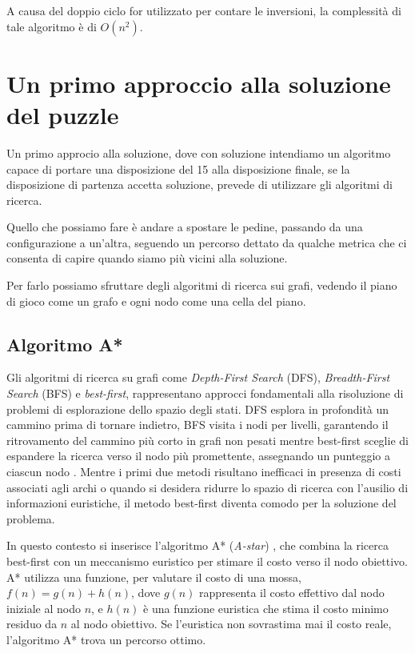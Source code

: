 A causa del doppio ciclo for utilizzato per contare le inversioni, la complessità di tale algoritmo è di $O(n^2)$.

\section{Un primo approccio alla soluzione del puzzle}
Un primo approcio alla soluzione, dove con soluzione intendiamo un algoritmo capace di portare una disposizione del 15 alla disposizione finale, se la disposizione di partenza accetta soluzione, prevede di utilizzare gli algoritmi di ricerca.

Quello che possiamo fare è andare a spostare le pedine, passando da una configurazione a un'altra, seguendo un percorso dettato da qualche metrica che ci consenta di capire quando siamo più vicini alla soluzione.

Per farlo possiamo sfruttare degli algoritmi di ricerca sui grafi, vedendo il piano di gioco come un grafo e ogni nodo come una cella del piano. 

\subsection{Algoritmo A*}
Gli algoritmi di ricerca su grafi come \textit{Depth-First Search} (DFS), \textit{Breadth-First Search} (BFS) e \textit{best-first}, rappresentano approcci fondamentali alla risoluzione di problemi di esplorazione dello spazio degli stati. DFS esplora in profondità un cammino prima di tornare indietro, BFS visita i nodi per livelli, garantendo il ritrovamento del cammino più corto in grafi non pesati mentre best-first sceglie di espandere la ricerca verso il nodo più promettente, assegnando un punteggio a ciascun nodo \cite{15}. Mentre i primi due metodi risultano inefficaci in presenza di costi associati agli archi o quando si desidera ridurre lo spazio di ricerca con l'ausilio di informazioni euristiche, il metodo best-first diventa comodo per la soluzione del problema. 

In questo contesto si inserisce l'algoritmo A* (\textit{A-star}) \cite{15}, che combina la ricerca best-first con un meccanismo euristico per stimare il costo verso il nodo obiettivo. A* utilizza una funzione, per valutare il costo di una mossa, \( f(n) = g(n) + h(n) \), dove \( g(n) \) rappresenta il costo effettivo dal nodo iniziale al nodo \( n \), e \( h(n) \) è una funzione euristica che stima il costo minimo residuo da \( n \) al nodo obiettivo. Se l’euristica non sovrastima mai il costo reale, l’algoritmo A* trova un percorso ottimo.


